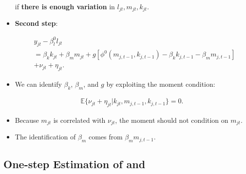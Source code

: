 \documentclass[]{book}
\begin{document}
\begin{itemize}
  if \textbf{there is enough variation} in \(l_{jt}, m_{jt}, k_{jt}\).
\item
  \textbf{Second step}:

  \begin{equation}
  \begin{split}
  &y_{jt} - \beta_l^0 l_{jt}\\
  & = \beta_k k_{jt} + \beta_m m_{jt} + g[\phi^0(m_{j, t - 1}, k_{j, t - 1}) - \beta_k k_{j, t - 1} - \beta_m m_{j, t - 1}]\\
  & + \nu_{jt} + \eta_{jt}.
  \end{split}
  \end{equation}
\item
  We can identify \(\beta_k\), \(\beta_m\), and \(g\) by exploiting the
  moment condition:

  \begin{equation}
  \begin{split}
  \mathbb{E}\{\nu_{jt} + \eta_{jt} | k_{jt}, m_{j, t - 1}, k_{j,t - 1}\} = 0.
  \end{split}
  \end{equation}
\item
  Because \(m_{jt}\) is correlated with \(\nu_{jt}\), the moment should
  not condition on \(m_{jt}\).
\item
  The identification of \(\beta_{m}\) comes from
  \(\beta_m m_{j, t - 1}\).
\end{itemize}

\subsection{\texorpdfstring{One-step Estimation of \citet{Olley1996} and
\citet{Levinsohn2003}}{One-step Estimation of @Olley1996 and @Levinsohn2003}}\label{one-step-estimation-of-olley1996-and-levinsohn2003}
\end{document}
